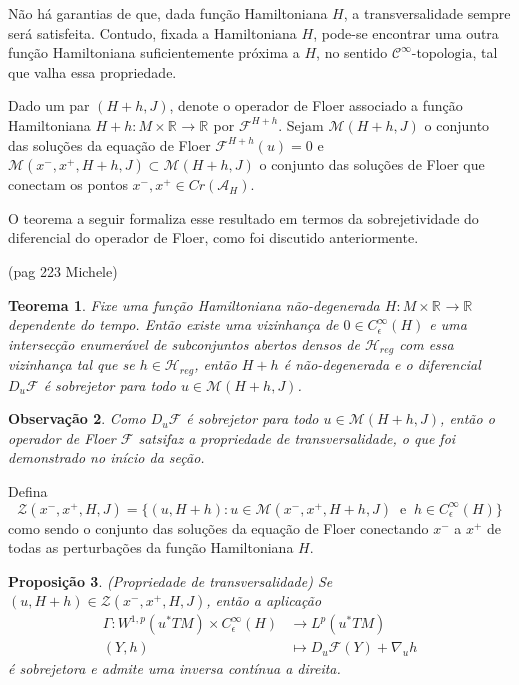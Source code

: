 \documentclass[12pt]{book}
\newtheorem{teorema}{Teorema}[section]
\newtheorem{observacao}[teorema]{Observação}
\newtheorem{proposicao}[teorema]{Proposição}
\newcommand{\cktopologia}[1]{\mathcal{C}^{#1}\text{-topologia}}
\newcommand{\diferencialfloerponto}[1]{D_{#1}\operadorFloer}
\newcommand{\energiafinitaM}{\mathcal{M}}
\newcommand{\energiafinitaMHamiltoniana}[1]{\energiafinitaM(#1, J)}
\newcommand{\energiafinitaMconectanteHamiltoniana}{\energiafinitaM(x^{-}, x^{+},H+h,J)}
\newcommand{\espacoLp}[1]{L^{p}(#1)}
\newcommand{\espacosobolev}[1]{W^{1,p}(#1)}
\newcommand{\funcionalH}{\mathcal{A}_{H}}
\newcommand{\hamiltonianasRegulares}{\mathcal{H}_{reg}}
\newcommand{\operadorFloer}{\mathcal{F}}
\newcommand{\orbitasConectantesZ}{\mathcal{Z}(x^{-}, x^{+},H, J)}
\newcommand{\paresregulares}{\mathcal{H}_{reg}}
\newcommand{\perturbacaoHamiltoniana}[1]{C^{\infty}_{\epsilon}(#1)}
\newcommand{\pontoscriticos}[1]{\textit{Cr}(#1)}
\newcommand{\pullbackfibradotangente}[2]{#1^{*}T#2}
\newcommand{\pullbackfibradotangenteM}[1]{\pullbackfibradotangente{#1}{M}}
\newcommand{\real}[1]{\mathbb{R}^{#1}}
\newcommand{\reta}{\real{}}
\newcommand{\aviso}[1]{{\color{violet}(#1)}}
\begin{document}
	Não há garantias de que, dada função Hamiltoniana $H$, a transversalidade sempre será satisfeita. Contudo, fixada a Hamiltoniana $H$, pode-se encontrar uma outra função Hamiltoniana suficientemente próxima a $H$, no sentido $\cktopologia{\infty}$, tal que valha essa propriedade. 
	
	Dado um par $(H+h, J)$, denote o operador de Floer associado a função Hamiltoniana $H+h:M\times \reta \to \reta$ por $\operadorFloer^{H+h}$. Sejam $\energiafinitaMHamiltoniana{H+h}$ o conjunto das soluções da equação de Floer $\operadorFloer^{H+h}(u)=0$ e  $\energiafinitaMconectanteHamiltoniana \subset \energiafinitaMHamiltoniana{H+h}$ o conjunto das soluções de Floer que conectam os pontos $x^{-}, x^{+} \in \pontoscriticos{\funcionalH}$.
	
	O teorema a seguir formaliza esse resultado em termos da sobrejetividade do diferencial do operador de Floer, como foi discutido anteriormente.

	\aviso{pag 223 Michele}

	\begin{teorema}
	Fixe uma função Hamiltoniana não-degenerada $H:M\times \reta\to \reta$ dependente do tempo. Então existe uma vizinhança de $0 \in \perturbacaoHamiltoniana{H}$ e uma intersecção enumerável de subconjuntos abertos densos de $\hamiltonianasRegulares$ com essa vizinhança tal que se $h\in \paresregulares$, então $H+h$ é não-degenerada e o diferencial $\diferencialfloerponto{u}$ é sobrejetor para todo $u \in \energiafinitaMHamiltoniana{H+h}$.
	\end{teorema}
	
	\begin{observacao}
		Como $\diferencialfloerponto{u}$ é sobrejetor para todo $u \in \energiafinitaMHamiltoniana{H+h}$, então o operador de Floer $\operadorFloer$ satsifaz a propriedade de transversalidade, o que foi demonstrado no início da seção.
	\end{observacao}
	
	Defina 
	$$
	\orbitasConectantesZ = \{ (u, H+h): u \in  \energiafinitaMconectanteHamiltoniana \;\;\text{e}\;\; h\in \perturbacaoHamiltoniana{H} \}
	$$
	como sendo o conjunto das soluções da equação de Floer conectando $x^{-}$ a $x^{+}$ de todas as perturbações da função Hamiltoniana $H$.

	\begin{proposicao}\label{proposicao_gamma_sobrejetora}
		(Propriedade de transversalidade) Se $(u, H+h) \in \orbitasConectantesZ$, então a aplicação 
		$$
		\begin{aligned}
			\Gamma:\espacosobolev{\pullbackfibradotangenteM{u}}\times \perturbacaoHamiltoniana{H} 
			&\to \espacoLp{\pullbackfibradotangenteM{u}}
			\\
			(Y, h) 
			&\mapsto \diferencialfloerponto{u}(Y) + \nabla_{u}h
		\end{aligned}
		$$
		é sobrejetora e admite uma inversa contínua a direita.
	\end{proposicao}
	
\end{document}
